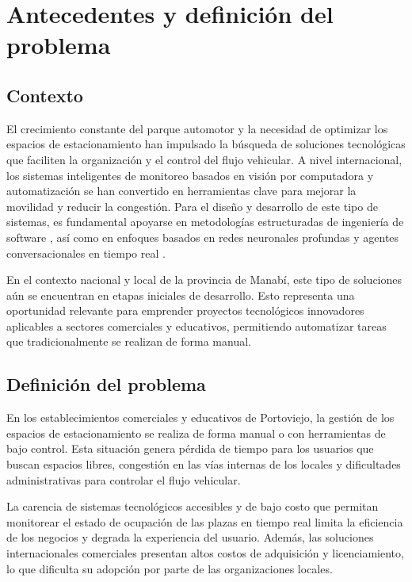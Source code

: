 \section{Antecedentes y definición del problema}

\subsection{Contexto}

El crecimiento constante del parque automotor y la necesidad de optimizar los espacios de estacionamiento han impulsado la búsqueda de soluciones tecnológicas que faciliten la organización y el control del flujo vehicular. A nivel internacional, los sistemas inteligentes de monitoreo basados en visión por computadora y automatización se han convertido en herramientas clave para mejorar la movilidad y reducir la congestión. Para el diseño y desarrollo de este tipo de sistemas, es fundamental apoyarse en metodologías estructuradas de ingeniería de software \parencite{Sommerville2016}, así como en enfoques basados en redes neuronales profundas y agentes conversacionales en tiempo real \parencite{Silva2024}.

En el contexto nacional y local de la provincia de Manabí, este tipo de soluciones aún se encuentran en etapas iniciales de desarrollo. Esto representa una oportunidad relevante para emprender proyectos tecnológicos innovadores aplicables a sectores comerciales y educativos, permitiendo automatizar tareas que tradicionalmente se realizan de forma manual.

\subsection{Definición del problema}

En los establecimientos comerciales y educativos de Portoviejo, la gestión de los espacios de estacionamiento se realiza de forma manual o con herramientas de bajo control. Esta situación genera pérdida de tiempo para los usuarios que buscan espacios libres, congestión en las vías internas de los locales y dificultades administrativas para controlar el flujo vehicular. 

La carencia de sistemas tecnológicos accesibles y de bajo costo que permitan monitorear el estado de ocupación de las plazas en tiempo real limita la eficiencia de los negocios y degrada la experiencia del usuario. Además, las soluciones internacionales comerciales presentan altos costos de adquisición y licenciamiento, lo que dificulta su adopción por parte de las organizaciones locales.

